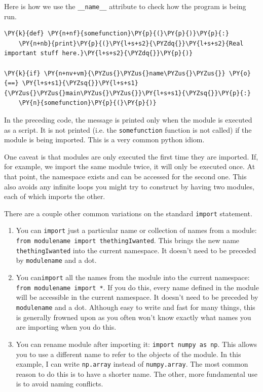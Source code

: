 Here is how we use the \texttt{\_\_name\_\_} attribute to check how the program is being run.

\begin{Verbatim}[commandchars=\\\{\}]
\PY{k}{def} \PY{n+nf}{somefunction}\PY{p}{(}\PY{p}{)}\PY{p}{:}
    \PY{n+nb}{print}\PY{p}{(}\PY{l+s+s2}{\PYZdq{}}\PY{l+s+s2}{Real important stuff here.}\PY{l+s+s2}{\PYZdq{}}\PY{p}{)}

\PY{k}{if} \PY{n+nv+vm}{\PYZus{}\PYZus{}name\PYZus{}\PYZus{}} \PY{o}{==} \PY{l+s+s1}{\PYZsq{}}\PY{l+s+s1}{\PYZus{}\PYZus{}main\PYZus{}\PYZus{}}\PY{l+s+s1}{\PYZsq{}}\PY{p}{:}
    \PY{n}{somefunction}\PY{p}{(}\PY{p}{)}
\end{Verbatim}



In the preceding code, the message is printed only when the module is executed as a script.  It is not printed (i.e. the \texttt{somefunction} function is not called) if the module is being imported.  This is a very common python idiom.


One caveat is that modules are only executed the first time they are imported.  If, for example, we import the same module twice, it will only be executed once.  At that point, the namespace exists and can be accessed for the second one.  This also avoids any infinite loops you might try to construct by having two modules, each of which imports the other.


There are a couple other common variations on the standard \texttt{import} statement.

\begin{enumerate}

\item You can \texttt{import} just a particular name or collection of names from a module: \texttt{from modulename import thethingIwanted}.  This brings the new name \texttt{thethingIwanted} into the current namespace.  It doesn’t need to be preceded by \texttt{modulename} and a dot.

\item You can\texttt{import} all the names from the module into the current namespace: \texttt{from modulename import *}.  If you do this, every name defined in the module will be accessible in the current namespace.  It doesn’t need to be preceded by \texttt{modulename} and a dot.  Although easy to write and fast for many things, this is generally frowned upon as you often won’t know exactly what names you are importing when you do this.

\item You can rename module after importing it: \texttt{import numpy as np}.  This allows you to use a different name to refer to the objects of the module.  In this example, I can write \texttt{np.array} instead of \texttt{numpy.array}.  The most common reason to do this is to have a shorter name.  The other, more fundamental use is to avoid naming conflicts.

\end{enumerate}